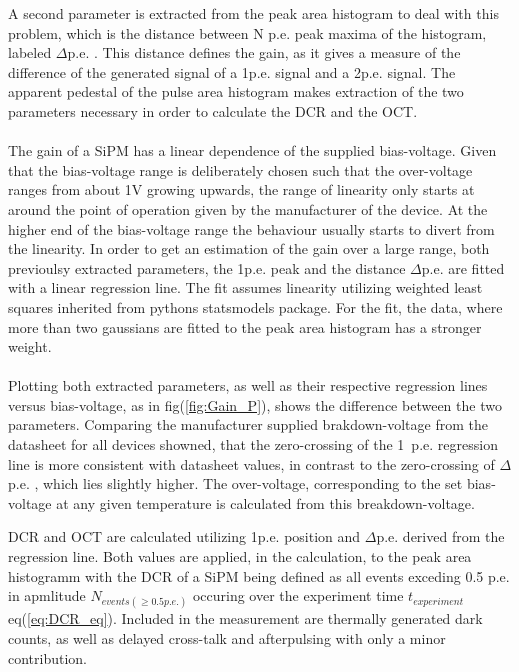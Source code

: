 \documentclass[12pt,article,type=msc,colorback,accentcolor=tud9c]{tudthesis}
\begin{document}
A second parameter is extracted from the peak area histogram to deal with this problem, which is the distance between N p.e. peak maxima of the histogram, labeled $\Delta$p.e. . This distance defines the gain, as it gives a measure of the difference of the generated signal of a 1p.e. signal and a 2p.e. signal. The apparent pedestal of the pulse area histogram makes extraction of the two parameters necessary in order to calculate the DCR and the OCT.\\\\ The gain of a SiPM has a linear dependence of the supplied bias-voltage. Given that the bias-voltage range is deliberately chosen such that the over-voltage ranges from about 1V growing upwards, the range of linearity only starts at around the point of operation given by the manufacturer of the device. At the higher end of the bias-voltage range the behaviour usually starts to divert from the linearity. In order to get an estimation of the gain over a large range, both previoulsy extracted parameters, the 1p.e. peak and the distance $\Delta$p.e. are fitted with a linear regression line. The fit assumes linearity utilizing weighted least squares inherited from pythons statsmodels package. For the fit, the data, where more than two gaussians are fitted to the peak area histogram has a stronger weight.\\\\ Plotting both extracted parameters, as well as their respective regression lines versus bias-voltage, as in fig(\ref{fig:Gain_P}), shows the difference between the two parameters. Comparing the manufacturer supplied brakdown-voltage from the datasheet for all devices showned, that the zero-crossing of the 1~p.e. regression line is more consistent with datasheet values, in contrast to the zero-crossing of $\Delta$p.e. , which lies slightly higher. The over-voltage, corresponding to the set bias-voltage at any given temperature is calculated from this breakdown-voltage. 


DCR and OCT are calculated utilizing 1p.e. position and $\Delta$p.e. derived from the regression line. Both values are applied, in the calculation, to the peak area histogramm with the DCR of a SiPM being defined as all events exceding 0.5 p.e. in apmlitude $N_{events(\geq 0.5p.e.)}$ occuring over the experiment time $t_{experiment}$ eq(\ref{eq:DCR_eq}). Included in the measurement are thermally generated dark counts, as well as delayed cross-talk and afterpulsing with only a minor contribution.
\end{document}
